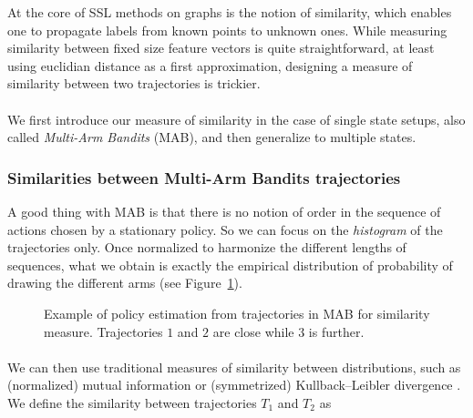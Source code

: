 \documentclass{article}
\begin{document}
At the core of SSL methods on graphs is the notion of similarity, which enables one to propagate labels from known points to unknown ones. While measuring similarity between fixed size feature vectors is quite straightforward, at least using euclidian distance as a first approximation, designing a measure of similarity between two trajectories is trickier.

\paragraph{}
We first introduce our measure of similarity in the case of single state setups, also called \emph{Multi-Arm Bandits} (MAB), and then generalize to multiple states.

\subsubsection{Similarities between Multi-Arm Bandits trajectories}

A good thing with MAB is that there is no notion of order in the sequence of actions chosen by a stationary policy. So we can focus on the \emph{histogram} of the trajectories only. Once normalized to harmonize the different lengths of sequences, what we obtain is exactly the empirical distribution of probability of drawing the different arms (see Figure~\ref{fig:hist}).

\begin{figure}
\begin{center}
\end{center}
\caption{Example of policy estimation from trajectories in MAB for similarity measure. Trajectories $1$ and $2$ are close while $3$ is further. \label{fig:hist}}
\end{figure}

\paragraph{}
We can then use traditional measures of similarity between distributions, such as (normalized) mutual information or (symmetrized) Kullback–Leibler divergence \cite{Kullback51}. We define the similarity between trajectories $T_1$ and $T_2$ as
\end{document}

